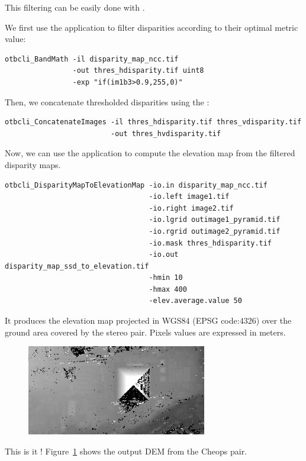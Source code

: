 This filtering can be easily done with \app.

We first use the  application to filter
disparities according to their optimal metric value:

\begin{verbatim}
otbcli_BandMath -il disparity_map_ncc.tif
                -out thres_hdisparity.tif uint8
                -exp "if(im1b3>0.9,255,0)"
\end{verbatim}

Then, we concatenate thresholded disparities using the :

\begin{verbatim}
otbcli_ConcatenateImages -il thres_hdisparity.tif thres_vdisparity.tif
                         -out thres_hvdisparity.tif
\end{verbatim}

Now, we can use the  application to
compute the elevation map from the filtered disparity maps.

\begin{verbatim}
otbcli_DisparityMapToElevationMap -io.in disparity_map_ncc.tif
                                  -io.left image1.tif
                                  -io.right image2.tif
                                  -io.lgrid outimage1_pyramid.tif
                                  -io.rgrid outimage2_pyramid.tif
                                  -io.mask thres_hdisparity.tif
                                  -io.out disparity_map_ssd_to_elevation.tif
                                  -hmin 10
                                  -hmax 400
                                  -elev.average.value 50
\end{verbatim}

It produces the elevation map projected in WGS84 (EPSG code:$4326$) over the
ground area covered by the stereo pair. Pixels values are expressed in meters.

\begin{figure}[!h]
  \center
  \includegraphics[width=0.7\textwidth]{../Art/MonteverdiImages/stereo_dem_zoom.png}
  \label{fig:stereo_out}
\end{figure}

This is it ! Figure~\ref{fig:stereo_out} shows the output DEM from the Cheops pair.
